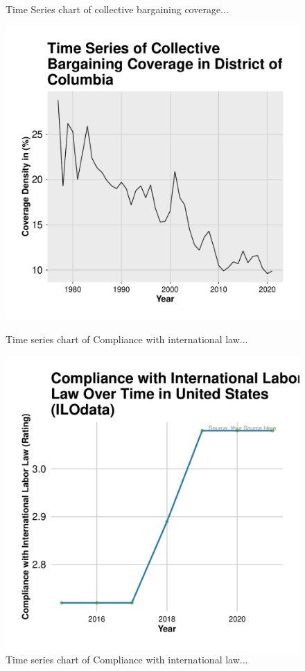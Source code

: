 \documentclass[11pt]{article}\usepackage[]{graphicx}\usepackage[]{xcolor}
\newenvironment{knitrout}{}{} %
\begin{document}
\begin{figure}[h!]
\begin{minipage}{0.48\linewidth}
\begin{knitrout}
{}


\end{knitrout}
    \caption{Time Series chart of collective bargaining coverage...}
  \end{minipage}

 \begin{minipage}{0.48\linewidth}
\begin{knitrout}
\color{fgcolor}

{\centering \includegraphics[width=0.7\linewidth]{figure/United_States_West_Virginia-1} 

}


\end{knitrout}
    \caption{Time series chart of Compliance with international law...}
 \end{minipage}
\hfill
  \begin{minipage}{0.48\linewidth}
\begin{knitrout}
\color{fgcolor}

{\centering \includegraphics[width=0.7\linewidth]{figure/United_States_labor_compliance-1} 

}


\end{knitrout}
    \caption{Time series chart of Compliance with international law...}
  \end{minipage}
\end{figure}
\end{document}
